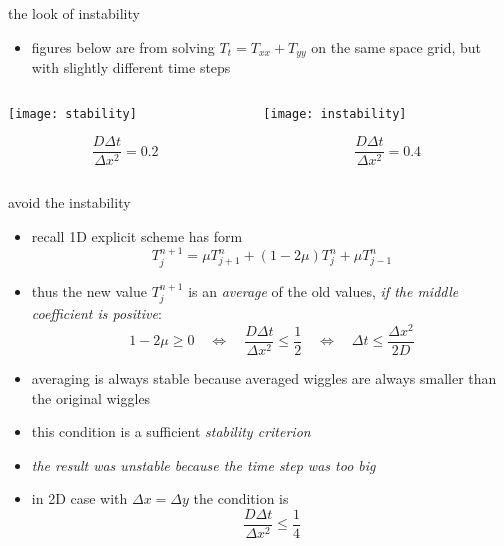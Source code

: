 \begin{frame}{the look of instability}

\begin{itemize}
\item figures below are from solving $T_t = T_{xx} + T_{yy}$ on the same space grid, but with slightly different time steps
\end{itemize}

\bigskip\bigskip
\begin{columns}
\begin{column}{0.5\textwidth}
\begin{center}
\texttt{[image: stability]}

$$\frac{D\Delta t}{\Delta x^2}= 0.2$$
\end{center}
\end{column}
\begin{column}{0.5\textwidth}
\begin{center}
\texttt{[image: instability]}

$$\frac{D\Delta t}{\Delta x^2}= 0.4$$
\end{center}
\end{column}
\end{columns}
\end{frame}


\begin{frame}{avoid the instability}

\begin{itemize}
\item recall 1D explicit scheme has form 
	$$T_j^{n+1} = \mu T_{j+1}^n + (1 - 2 \mu) T_j^n + \mu T_{j-1}^n$$
\item thus the new value $T_j^{n+1}$ is an \emph{average} of the old values, \emph{if the middle coefficient is positive}:
	$$1 - 2 \mu \ge 0 \quad \iff \quad  \frac{D\Delta t}{\Delta x^2} \le \frac{1}{2} \quad \iff \quad \Delta t \le \frac{\Delta x^2}{2 D}$$
\item averaging is always stable because averaged wiggles are always smaller than the original wiggles
\item this condition is a sufficient \emph{stability criterion}
\item \emph{the result was unstable because the time step was too big}
\item in 2D case with $\Delta x= \Delta y$ the condition is
	$$\frac{D\Delta t}{\Delta x^2} \le \frac{1}{4}$$
\end{itemize}
\end{frame}


